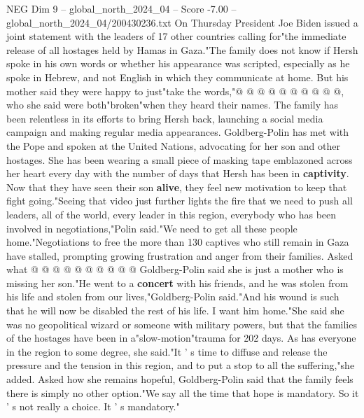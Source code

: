 \begin{textsample}{NEG Dim 9 – global\_north\_2024\_04 – Score -7.00 – global\_north\_2024\_04/200430236.txt}
On Thursday President Joe Biden issued a joint statement with the leaders of 17 other countries calling for"the immediate release of all hostages held by Hamas in Gaza."The family does not know if Hersh spoke in his own words or whether his appearance was scripted, especially as he spoke in Hebrew, and not English in which they communicate at home.
But his mother said they were happy to just"take the words,"@ @ @ @ @ @ @ @ @ @, who she said were both"broken"when they heard their names.
The family has been relentless in its efforts to bring Hersh back, launching a social media campaign and making regular media appearances.
Goldberg-Polin has met with the Pope and spoken at the United Nations, advocating for her son and other hostages.
She has been wearing a small piece of masking tape emblazoned across her heart every day with the number of days that Hersh has been in \textbf{captivity}.
Now that they have seen their son \textbf{alive}, they feel new motivation to keep that fight going."Seeing that video just further lights the fire that we need to push all leaders, all of the world, every leader in this region, everybody who has been involved in negotiations,"Polin said."We need to get all these people home."Negotiations to free the more than 130 captives who still remain in Gaza have stalled, prompting growing frustration and anger from their families.
Asked what @ @ @ @ @ @ @ @ @ @ Goldberg-Polin said she is just a mother who is missing her son."He went to a \textbf{concert} with his friends, and he was stolen from his life and stolen from our lives,"Goldberg-Polin said."And his wound is such that he will now be disabled the rest of his life.
I want him home."She said she was no geopolitical wizard or someone with military powers, but that the families of the hostages have been in a"slow-motion"trauma for 202 days.
As has everyone in the region to some degree, she said."It ' s time to diffuse and release the pressure and the tension in this region, and to put a stop to all the suffering,"she added.
Asked how she remains hopeful, Goldberg-Polin said that the family feels there is simply no other option."We say all the time that hope is mandatory.
So it ' s not really a choice.
It ' s mandatory."

\end{textsample}
